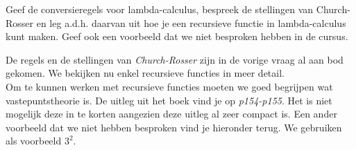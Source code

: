 \begin{quest}[Recursie]
	Geef de conversieregels voor lambda-calculus, bespreek de stellingen van Church-Rosser en leg a.d.h. daarvan uit hoe je een recursieve functie in lambda-calculus kunt maken. Geef ook een voorbeeld dat we niet besproken hebben in de cursus.
\end{quest}

De regels en de stellingen van \emph{Church-Rosser} zijn in de vorige vraag al aan bod gekomen. We bekijken nu enkel recursieve functies in meer detail.\\

Om te kunnen werken met recursieve functies moeten we goed begrijpen wat vastepuntstheorie is. De uitleg uit het boek vind je op \emph{p154-p155}. Het is niet mogelijk deze in te korten aangezien deze uitleg al zeer compact is. Een ander voorbeeld dat we niet hebben besproken vind je hieronder terug. We gebruiken als voorbeeld $3^2$.

